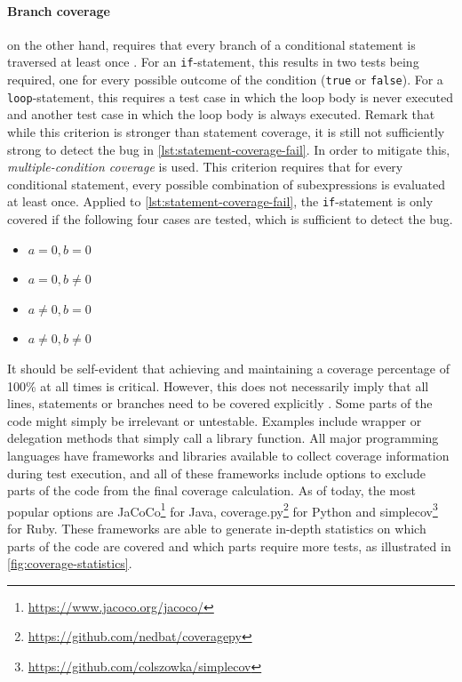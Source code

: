 \paragraph*{Branch coverage} on the other hand, requires that every branch of a conditional statement is traversed at least once \cite[p.~37]{Myers:2011:AST:2161638}. For an \texttt{if}-statement, this results in two tests being required, one for every possible outcome of the condition (\texttt{true} or \texttt{false}). For a \texttt{loop}-statement, this requires a test case in which the loop body is never executed and another test case in which the loop body is always executed. Remark that while this criterion is stronger than statement coverage, it is still not sufficiently strong to detect the bug in \autoref{lst:statement-coverage-fail}. In order to mitigate this, \emph{multiple-condition coverage} \cite[p.~40]{Myers:2011:AST:2161638} is used. This criterion requires that for every conditional statement, every possible combination of subexpressions is evaluated at least once. Applied to \autoref{lst:statement-coverage-fail}, the \texttt{if}-statement is only covered if the following four cases are tested, which is sufficient to detect the bug.
\begin{itemize}
	\item $a = 0, b = 0$
	\item $a = 0, b \neq 0$
	\item $a \neq 0, b = 0$
	\item $a \neq 0, b \neq 0$
\end{itemize}

\noindent It should be self-evident that achieving and maintaining a coverage percentage of 100\% at all times is critical. However, this does not necessarily imply that all lines, statements or branches need to be covered explicitly \cite{dein_2019}. Some parts of the code might simply be irrelevant or untestable. Examples include wrapper or delegation methods that simply call a library function. All major programming languages have frameworks and libraries available to collect coverage information during test execution, and all of these frameworks include options to exclude parts of the code from the final coverage calculation. As of today, the most popular options are JaCoCo\footnote{\url{https://www.jacoco.org/jacoco/}} for Java, coverage.py\footnote{\url{https://github.com/nedbat/coveragepy}} for Python and simplecov\footnote{\url{https://github.com/colszowka/simplecov}} for Ruby. These frameworks are able to generate in-depth statistics on which parts of the code are covered and which parts require more tests, as illustrated in \autoref{fig:coverage-statistics}.

